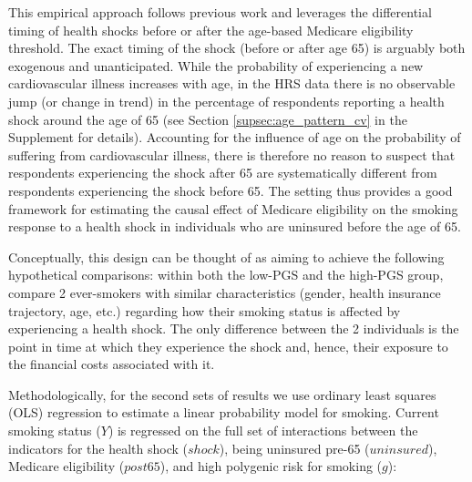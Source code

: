 \documentclass[12pt]{article}
\begin{document}
This empirical approach follows previous work\cite{Marti2017} and leverages the differential timing of health shocks before or after the age-based Medicare eligibility threshold. The exact timing of the shock (before or after age 65) is arguably both exogenous and unanticipated.
While the probability of experiencing a new cardiovascular illness increases with age,\cite{Lloyd-Jones2010} in the HRS data there is no observable jump (or change in trend) in the percentage of respondents reporting a health shock around the age of 65 (see Section \ref*{supsec:age_pattern_cv} in the Supplement for details). Accounting for the influence of age on the probability of suffering from cardiovascular illness, there is therefore no reason to suspect that respondents experiencing the shock after 65 are systematically different from respondents experiencing the shock before 65. The setting thus provides a good framework for estimating the causal effect of Medicare eligibility on the smoking response to a health shock in individuals who are uninsured before the age of 65.

Conceptually, this design can be thought of as aiming to achieve the following hypothetical comparisons: within both the low-PGS and the high-PGS group, compare 2 ever-smokers with similar characteristics (gender, health insurance trajectory, age, etc.) regarding how their smoking status is affected by experiencing a health shock. The only difference between the 2 individuals is the point in time at which they experience the shock and, hence, their exposure to the financial costs associated with it.

Methodologically, for the second sets of results we use ordinary least squares (OLS) regression to estimate a linear probability model for smoking. Current smoking status ($Y$) is regressed on the full set of interactions between the indicators for the health shock ($shock$), being uninsured pre-65 ($uninsured$), Medicare eligibility ($post65$), and high polygenic risk for smoking ($g$):
\end{document}
